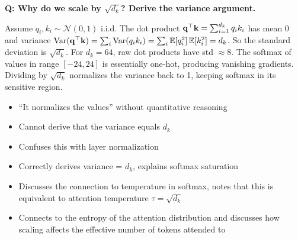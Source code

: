 \bigskip

\begin{interviewq}
\textbf{Q: Why do we scale by $\sqrt{d_k}$? Derive the variance argument.}

 \quad {} \quad \badgefreq{\freqhigh}

\stronganswer
Assume $q_i, k_i \sim \mathcal{N}(0, 1)$ i.i.d.  The dot product
$\mathbf{q}^\top\mathbf{k} = \sum_{i=1}^{d_k} q_i k_i$ has mean 0 and variance
$\operatorname{Var}(\mathbf{q}^\top\mathbf{k}) = \sum_i \operatorname{Var}(q_i k_i) = \sum_i \operatorname{\mathbb{E}}[q_i^2]\operatorname{\mathbb{E}}[k_i^2] = d_k$.
So the standard deviation is $\sqrt{d_k}$.  For $d_k = 64$, raw dot products
have std $\approx 8$.  The softmax of values in range $[-24, 24]$ is
essentially one-hot, producing vanishing gradients.  Dividing by $\sqrt{d_k}$
normalizes the variance back to 1, keeping softmax in its sensitive region.

\redflags
\begin{itemize}
    \item ``It normalizes the values'' without quantitative reasoning
    \item Cannot derive that the variance equals $d_k$
    \item Confuses this with layer normalization
\end{itemize}


\goodgreat
\begin{itemize}
    \item {} Correctly derives variance = $d_k$, explains softmax
          saturation
    \item {} Discusses the connection to temperature in softmax,
          notes that this is equivalent to attention temperature $\tau = \sqrt{d_k}$
    \item {} Connects to the entropy of the attention distribution
          and discusses how scaling affects the effective number of tokens attended to
\end{itemize}

\end{interviewq}

\bigskip

